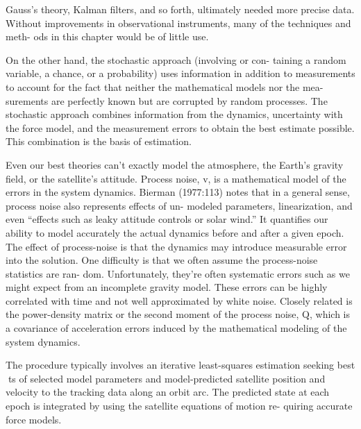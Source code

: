 Gauss’s theory, Kalman filters, and so forth, ultimately needed more precise data.
Without improvements in observational instruments, many of the techniques and meth-
ods in this chapter would be of little use.

On the other hand, the stochastic approach (involving or con-
taining a random variable, a chance, or a probability) uses information in addition to
measurements to account for the fact that neither the mathematical models nor the mea-
surements are perfectly known but are corrupted by random processes. The stochastic
approach combines information from the dynamics, uncertainty with the force model,
and the measurement errors to obtain the best estimate possible. This combination is the
basis of estimation.

Even our best theories can’t exactly model the atmosphere, the Earth’s gravity field,
or the satellite’s attitude. Process noise, v, is a mathematical model of the errors in the
system dynamics. Bierman (1977:113) notes that in a general sense, process noise also represents effects of un-
modeled parameters, linearization, and even “effects such as leaky attitude controls or solar
wind.” It quantifies our ability to model accurately the actual dynamics
before and after a given epoch. The effect of process-noise is that the dynamics may introduce measurable error into
the solution. One difficulty is that we often assume the process-noise statistics are ran-
dom. Unfortunately, they’re often systematic errors such as we might expect from an
incomplete gravity model. These errors can be highly correlated with time and not well
approximated by white noise. Closely related is the power-density matrix or the second
moment of the process noise, Q, which is a covariance of acceleration errors induced by
the mathematical modeling of the system dynamics.

The procedure typically involves an iterative least-squares estimation
seeking best ts of selected model parameters and model-predicted satellite
position and velocity to the tracking data along an orbit arc. The predicted
state at each epoch is integrated by using the satellite equations of motion re-
quiring accurate force models.

